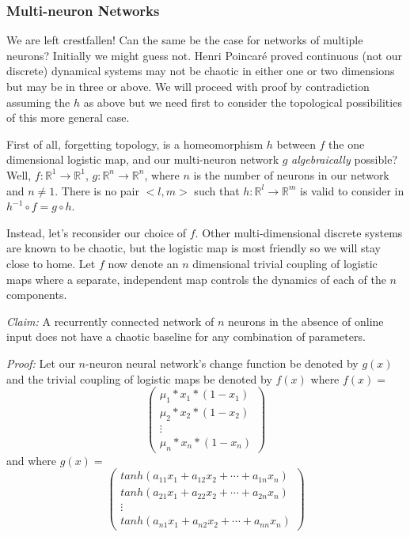 \documentclass[12pt]{article}
\begin{document}
\subsubsection{Multi-neuron Networks}

We are left crestfallen!  Can the same be the case for networks of multiple
neurons?  Initially we might guess not.  Henri Poincar\'e proved continuous
(not our discrete) dynamical systems may not be chaotic in either one or two
dimensions but may be in three or above.  We will proceed with proof by 
contradiction assuming the $h$ as above but we need first to consider the
topological possibilities of this more general case.

First of all, forgetting topology, is a homeomorphism $h$ between $f$ the one 
dimensional logistic map, and our multi-neuron network $g$ 
\textit{algebraically} possible?  Well, 
$f : \mathbb{R}^{1} \rightarrow \mathbb{R}^{1}$, 
$g : \mathbb{R}^{n} \rightarrow \mathbb{R}^{n}$, where $n$ is the number of
neurons in our network and $n \neq 1$.  There is no pair $<l, m>$ such 
that $h : \mathbb{R}^{l} \rightarrow \mathbb{R}^{m}$ is valid to 
consider in $h^{-1} \circ f = g \circ h$.

Instead, let's reconsider our choice of $f$.  Other multi-dimensional discrete
systems are known to be chaotic, but the logistic map is most friendly so we
will stay close to home.  Let $f$ now denote an $n$ dimensional trivial
coupling of logistic maps where a separate, independent map controls the
dynamics of each of the $n$ components.

\textit{Claim:}  A recurrently connected network of $n$ neurons in the absence
of online input does not have a chaotic baseline for any combination of
parameters.

\textit{Proof:}
Let our $n$-neuron neural network's change function be denoted by $g(x)$ 
and the trivial coupling of logistic maps be denoted by $f(x)$ where $f(x) =$
\[ \left( \begin{array}{c}
\mu_{1}*x_{1}*(1-x_{1}) \\
\mu_{2}*x_{2}*(1-x_{2}) \\
\vdots \\
\mu_{n}*x_{n}*(1-x_{n}) \end{array} \right)\]
and where $g(x) =$
\[ \left( \begin{array}{c}
tanh(a_{11}x_{1} + a_{12}x_{2} + \cdots + a_{1n}x_{n}) \\
tanh(a_{21}x_{1} + a_{22}x_{2} + \cdots + a_{2n}x_{n}) \\
\vdots \\
tanh(a_{n1}x_{1} + a_{n2}x_{2} + \cdots + a_{nn}x_{n}) \end{array} \right)\]
\end{document}
